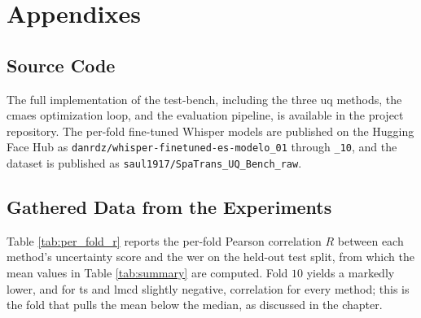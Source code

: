 
\chapter{Appendixes}
\label{chapter:appendixes}

\newpage

\section{Source Code}

\label{deliverable:source-code}

The full implementation of the test-bench, including the three \acrshort{uq} methods, the \acrshort{cmaes} optimization loop, and the evaluation pipeline, is available in the project repository. The per-fold fine-tuned Whisper models are published on the Hugging Face Hub as \texttt{danrdz/whisper-finetuned-es-modelo\_01} through \texttt{\_10}, and the dataset is published as \texttt{saul1917/SpaTrans\_UQ\_Bench\_raw}.

\section{Gathered Data from the Experiments}

Table \ref{tab:per_fold_r} reports the per-fold Pearson correlation $R$ between each method's uncertainty score and the \acrshort{wer} on the held-out test split, from which the mean values in Table \ref{tab:summary} are computed. Fold $10$ yields a markedly lower, and for \acrshort{ts} and \acrshort{lmcd} slightly negative, correlation for every method; this is the fold that pulls the mean below the median, as discussed in the  chapter.

